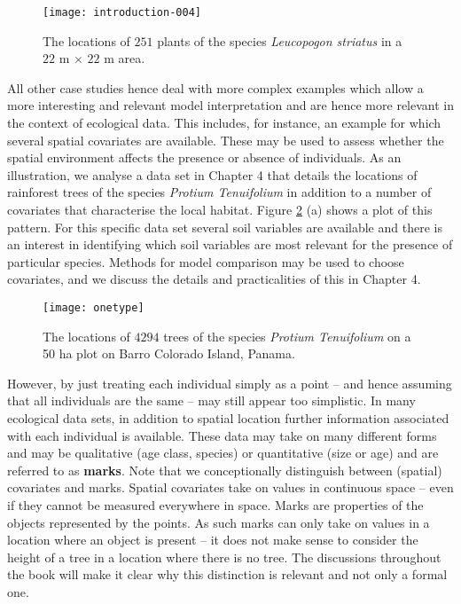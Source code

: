 \begin{figure}[h]
\begin{center}
\texttt{[image: introduction-004]}
\end{center}
\caption{The locations of $251$ plants of the species \textit{Leucopogon striatus} in a  $22\mbox{ m}$ $\times$ $22$ m area.}
\label{chap1:fig1}
\end{figure}

All other case studies hence deal with more complex examples which allow a more interesting and relevant model interpretation and are hence more relevant in the context of ecological data. This includes, for instance, an example for which several spatial covariates are available. These may be used to assess whether the spatial environment affects the presence or absence of individuals.  As an illustration, we analyse a data set in Chapter 4 that details the locations of rainforest trees of the species \textit{Protium Tenuifolium} in addition to a number of covariates that characterise the local habitat. Figure \ref{chap1:fig2} (a) shows a plot of this pattern.
For this specific data set several soil variables are available and there is an interest in identifying which soil variables are most relevant for the presence of particular species. Methods for model comparison may be used to choose covariates, and we discuss the details and practicalities of this in Chapter 4.

\begin{figure}[h]
\begin{center}
\texttt{[image: onetype]}
\end{center}
\caption{The locations of $4294$ trees of the species \textit{Protium Tenuifolium} on a 50 ha plot on Barro Colorado Island, Panama.}
\label{chap1:fig2}
\end{figure}

However, by just treating each individual simply as a point -- and hence assuming that all individuals are the same -- may still appear too simplistic. In many ecological data sets, in addition to spatial location further information associated with each individual is available. These data may take on many different forms and may be qualitative (age class, species) or quantitative (size or age) and are referred to as \textbf{marks}.  Note that we conceptionally distinguish between (spatial) covariates and marks. Spatial covariates take on values in continuous space -- even if they cannot be measured everywhere in space. Marks are properties of the objects represented by the points. As such marks can only take on values in a location where an object is present -- it does not make sense to consider the height of a tree in a location where there is no tree. The discussions throughout the book will make it clear why this distinction is relevant and not only a formal one.

